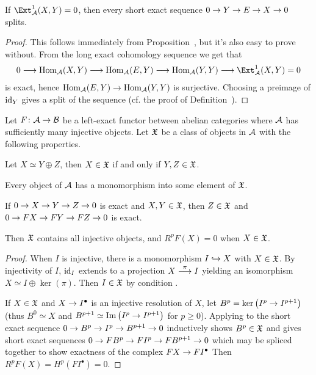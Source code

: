 \documentclass[a4paper,parskip=half,numbers=enddot, DIV=12]{scrreprt}
\begin{document}
\begin{cor}
	If $\Ext_\Aa^1(X,Y)=0$, then every short exact sequence $0\morphism Y\morphism E\morphism X\morphism 0$ splits.
\end{cor}
\begin{proof}
	This follows immediately from Proposition~, but it's also easy to prove without. From the long exact cohomology sequence  we get that
	\begin{align*}
		0\morphism\Hom_\Aa(X,Y)\morphism\Hom_\Aa(E,Y)\morphism\Hom_\Aa(Y,Y)\morphism \Ext_\Aa^1(X,Y)=0
	\end{align*}
	is exact, hence $\Hom_\Aa(E,Y)\morphism\Hom_\Aa(Y,Y)$ is surjective. Choosing a preimage of $\operatorname{id}_Y$ gives a split of the sequence (cf. the proof of Definition~).
\end{proof}
\begin{prop}
	Let $F\colon \Aa\morphism\Bb$ be a left-exact functor between abelian categories where $\mathcal{A}$ has sufficiently many injective objects. Let $\mathfrak{X}$ be a class of objects in $\mathcal{A}$ with the following properties.
	\begin{alphanumerate}
		\item Let $X\simeq Y\oplus Z$, then $X\in\mathfrak{X}$ if and only if $Y,Z\in\mathfrak{X}$.
		\item Every object of $\mathcal{A}$ has a monomorphism into some element of $\mathfrak{X}$.
		\item If $0\morphism X\morphism Y\morphism Z\morphism 0$ is exact and $X,Y\in\mathfrak{X}$, then $Z\in\mathfrak{X}$ and $0\morphism FX\morphism FY\morphism FZ\morphism 0$  is exact.
	\end{alphanumerate}
	Then $\mathfrak{X}$ contains all injective objects, and $R^pF(X)=0$ when $X\in\mathfrak{X}$.
\end{prop}
\begin{proof}
	When $I$ is injective, there is a monomorphism $I\monomorphism X$ with $X\in \mathfrak{X}$. By injectivity of $I$, $\operatorname{id}_I$ extends to a projection $X\morphism[\pi]I$ yielding an isomorphism $X\simeq I\oplus\ker(\pi)$. Then $I\in\mathfrak{X}$ by condition .
	
	If $X\in\mathfrak{X}$ and $X\morphism I^\bullet$ is an injective resolution of $X$, let $B^p=\ker\left(I^p\morphism I^{p+1}\right)$ (thus $B^0\simeq X$ and $B^{p+1}\simeq \Im\left(I^p\morphism I^{p+1}\right)$ for $p\geq 0$). Applying  to the short exact sequence $0\morphism B^p\morphism I^p\morphism B^{p+1}\morphism 0$ inductively shows $B^p\in \mathfrak{X}$ and gives short exact sequences $0\morphism FB^p\morphism FI^p\morphism FB^{p+1}\morphism 0$ which may be spliced together to show exactness of the complex $FX\morphism FI^\bullet$ Then $R^pF(X)=H^p(FI^\bullet)=0$.
\end{proof}
\end{document}
